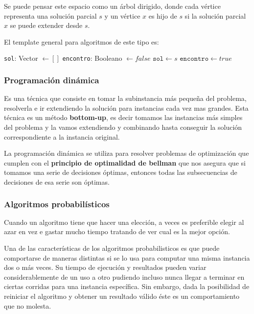 Se puede pensar este espacio como un árbol dirigido, donde cada vértice representa una solución parcial \(s\) y un vértice \(x\) es hijo de \(s\) si la solución parcial \(x\) se puede extender desde \(s\). 

El template general para algoritmos de este tipo es: 

\begin{algorithmic}
	\State \texttt{sol}: Vector \(\gets [] \)
	\State \texttt{encontro}: Booleano \(\gets false \)
	\State\(\texttt{sol} \gets s\)
	\State \(\texttt{encontro} \gets true\)
	\Else
			~\Return
			\EndIf
		\EndFor
	\EndIf
	\EndFunction
\end{algorithmic}

\subsubsection{Programación dinámica}

Es una técnica que consiste en tomar la subinstancia más pequeña del problema, resolverla e ir extendiendo la solución para instancias cada vez mas grandes. Esta técnica es un método \textbf{bottom-up}, es decir tomamos las instancias más simples del problema y la vamos extendiendo y combinando hasta conseguir la solución correspondiente a la instancia original.

La programación dinámica se utiliza para resolver problemas de optimización que cumplen con el \textbf{principio de optimalidad de bellman} que nos asegura que si tomamos una serie de decisiones óptimas, entonces todas las subsecuencias de decisiones de esa serie son óptimas.

\subsubsection{Algoritmos probabilísticos}
Cuando un algoritmo tiene que hacer una elección, a veces es preferible elegir al azar en vez e gastar mucho tiempo tratando de ver cual es la mejor opción.

Una de las características de los algoritmos probabilisticos es que puede comportarse de maneras distintas si se lo usa para computar una misma instancia dos o más veces. Su tiempo de ejecución y resultados pueden variar considerablemente de un uso a otro pudiendo incluso nunca llegar a terminar en ciertas corridas para una instancia específica. Sin embargo, dada la posibilidad de reiniciar el algoritmo y obtener un resultado válido éste es un comportamiento que no molesta. 

